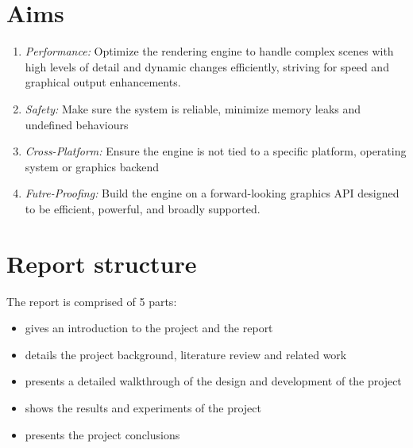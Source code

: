 \section{Aims}
\label{aims}
\begin{enumerate}
\item \emph{Performance:} Optimize the rendering engine to handle complex scenes with high levels of detail and dynamic changes efficiently, striving for speed and graphical output enhancements.
  \item \emph{Safety:} Make sure the system is reliable, minimize memory leaks and undefined behaviours
  \item \emph{Cross-Platform:} Ensure the engine is not tied to a specific platform, operating system or graphics backend
  \item \emph{Futre-Proofing:} Build the engine on a forward-looking graphics API designed to be efficient, powerful, and broadly supported.
\end{enumerate}

\section{Report structure}
The report is comprised of 5 parts:

\begin{itemize}
    \item {} gives an introduction to the project and the report
    \item {} details the project background, literature review and related work
    \item {} presents a detailed walkthrough of the design and development of the project
    \item {} shows the results and experiments of the project
    \item {} presents the project conclusions
\end{itemize}
